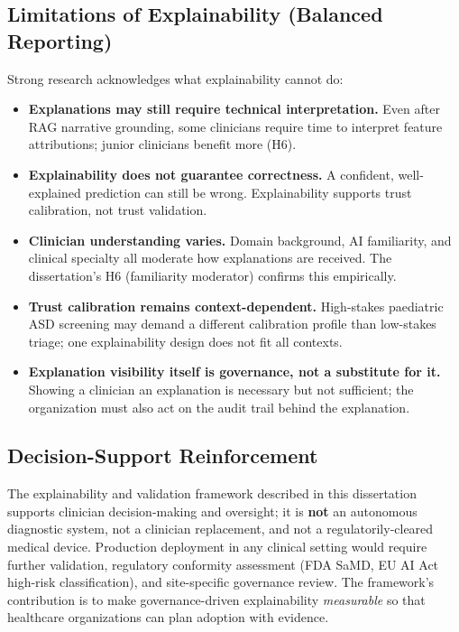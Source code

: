\subsection*{Limitations of Explainability (Balanced Reporting)}
\label{sec:eval_xai_limitations}

\noindent Strong research acknowledges what explainability cannot do:

\begin{itemize}[leftmargin=*, itemsep=2pt]
    \item \textbf{Explanations may still require technical interpretation.} Even after RAG narrative grounding, some clinicians require time to interpret feature attributions; junior clinicians benefit more (H6).
    \item \textbf{Explainability does not guarantee correctness.} A confident, well-explained prediction can still be wrong. Explainability supports trust calibration, not trust validation.
    \item \textbf{Clinician understanding varies.} Domain background, AI familiarity, and clinical specialty all moderate how explanations are received. The dissertation's H6 (familiarity moderator) confirms this empirically.
    \item \textbf{Trust calibration remains context-dependent.} High-stakes paediatric ASD screening may demand a different calibration profile than low-stakes triage; one explainability design does not fit all contexts.
    \item \textbf{Explanation visibility itself is governance, not a substitute for it.} Showing a clinician an explanation is necessary but not sufficient; the organization must also act on the audit trail behind the explanation.
\end{itemize}

\subsection*{Decision-Support Reinforcement}

\noindent The explainability and validation framework described in this dissertation supports clinician decision-making and oversight; it is \textbf{not} an autonomous diagnostic system, not a clinician replacement, and not a regulatorily-cleared medical device. Production deployment in any clinical setting would require further validation, regulatory conformity assessment (FDA SaMD, EU AI Act high-risk classification), and site-specific governance review. The framework's contribution is to make governance-driven explainability \emph{measurable} so that healthcare organizations can plan adoption with evidence.

